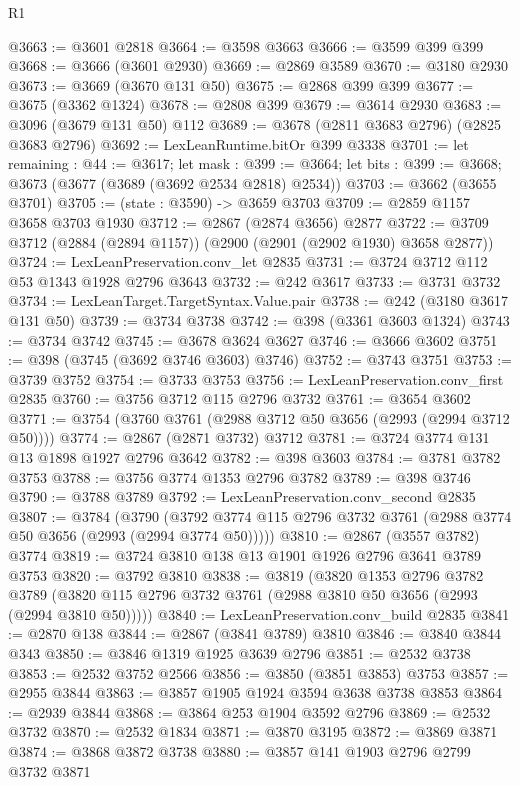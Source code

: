 \begin{lexlean}{R1}
\begin{coremodule}
@3663 := @3601 @2818
@3664 := @3598 @3663
@3666 := @3599 @399 @399
@3668 := @3666 (@3601 @2930)
@3669 := @2869 @3589
@3670 := @3180 @2930
@3673 := @3669 (@3670 @131 @50)
@3675 := @2868 @399 @399
@3677 := @3675 (@3362 @1324)
@3678 := @2808 @399
@3679 := @3614 @2930
@3683 := @3096 (@3679 @131 @50) @112
@3689 := @3678 (@2811 @3683 @2796) (@2825 @3683 @2796)
@3692 := LexLeanRuntime.bitOr @399 @3338
@3701 := let remaining : @44 := @3617;
  let mask : @399 := @3664;
  let bits : @399 := @3668; @3673 (@3677 (@3689 (@3692 @2534 @2818) @2534))
@3703 := @3662 (@3655 @3701)
@3705 := (state : @3590) -> @3659 @3703
@3709 := @2859 @1157 @3658 @3703 @1930
@3712 := @2867 (@2874 @3656) @2877
@3722 := @3709 @3712 (@2884 (@2894 @1157)) (@2900 (@2901 (@2902 @1930) @3658 @2877))
@3724 := LexLeanPreservation.conv_let @2835
@3731 := @3724 @3712 @112 @53 @1343 @1928 @2796 @3643
@3732 := @242 @3617
@3733 := @3731 @3732
@3734 := LexLeanTarget.TargetSyntax.Value.pair
@3738 := @242 (@3180 @3617 @131 @50)
@3739 := @3734 @3738
@3742 := @398 (@3361 @3603 @1324)
@3743 := @3734 @3742
@3745 := @3678 @3624 @3627
@3746 := @3666 @3602
@3751 := @398 (@3745 (@3692 @3746 @3603) @3746)
@3752 := @3743 @3751
@3753 := @3739 @3752
@3754 := @3733 @3753
@3756 := LexLeanPreservation.conv_first @2835
@3760 := @3756 @3712 @115 @2796 @3732
@3761 := @3654 @3602
@3771 := @3754 (@3760 @3761 (@2988 @3712 @50 @3656 (@2993 (@2994 @3712 @50))))
@3774 := @2867 (@2871 @3732) @3712
@3781 := @3724 @3774 @131 @13 @1898 @1927 @2796 @3642
@3782 := @398 @3603
@3784 := @3781 @3782 @3753
@3788 := @3756 @3774 @1353 @2796 @3782
@3789 := @398 @3746
@3790 := @3788 @3789
@3792 := LexLeanPreservation.conv_second @2835
@3807 := @3784
    (@3790 (@3792 @3774 @115 @2796 @3732 @3761 (@2988 @3774 @50 @3656 (@2993 (@2994 @3774 @50)))))
@3810 := @2867 (@3557 @3782) @3774
@3819 := @3724 @3810 @138 @13 @1901 @1926 @2796 @3641 @3789 @3753
@3820 := @3792 @3810
@3838 := @3819
    (@3820
      @1353
      @2796
      @3782
      @3789
      (@3820 @115 @2796 @3732 @3761 (@2988 @3810 @50 @3656 (@2993 (@2994 @3810 @50)))))
@3840 := LexLeanPreservation.conv_build @2835
@3841 := @2870 @138
@3844 := @2867 (@3841 @3789) @3810
@3846 := @3840 @3844 @343
@3850 := @3846 @1319 @1925 @3639 @2796
@3851 := @2532 @3738
@3853 := @2532 @3752 @2566
@3856 := @3850 (@3851 @3853) @3753
@3857 := @2955 @3844
@3863 := @3857 @1905 @1924 @3594 @3638 @3738 @3853
@3864 := @2939 @3844
@3868 := @3864 @253 @1904 @3592 @2796
@3869 := @2532 @3732
@3870 := @2532 @1834
@3871 := @3870 @3195
@3872 := @3869 @3871
@3874 := @3868 @3872 @3738
@3880 := @3857 @141 @1903 @2796 @2799 @3732 @3871

\end{coremodule}
\end{lexlean}
